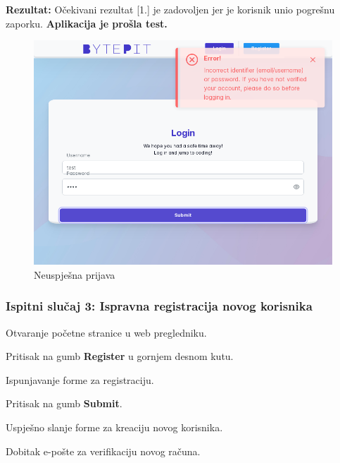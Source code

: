 			\noindent \textbf{Rezultat:} Očekivani rezultat [1.] je zadovoljen jer je korisnik unio pogrešnu zaporku. \textbf{Aplikacija je prošla test.}
			
			\begin{figure}[H]
				\includegraphics[scale=0.38]{slike/failed_login.PNG}
				\centering
				\caption{Neuspješna prijava}
				\label{fig:failed_login}
			\end{figure}
			
			\subsubsection{Ispitni slučaj 3: Ispravna registracija novog korisnika}
			
			
			\begin{packed_enum}
				
				\item  Otvaranje početne stranice u web pregledniku.
				\item  Pritisak na gumb \textbf{Register} u gornjem desnom kutu.
				\item  Ispunjavanje forme za registraciju.
				\item  Pritisak na gumb \textbf{Submit}. 
				
			\end{packed_enum}
			
			\begin{packed_enum}
				
				\item  Uspješno slanje forme za kreaciju novog korisnika.
				\item  Dobitak e-pošte za verifikaciju novog računa.
				
			\end{packed_enum}
			
